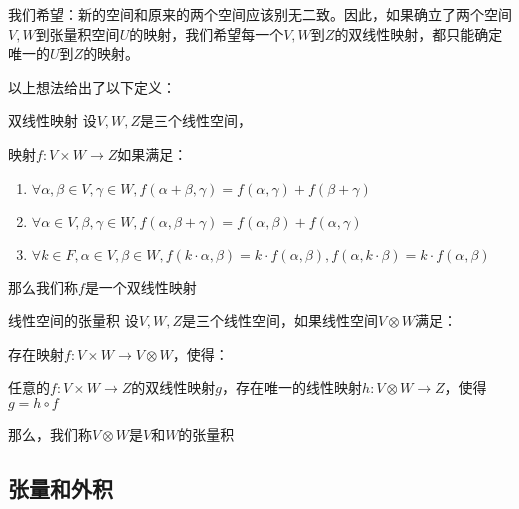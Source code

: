 \documentclass[12pt, a4paper, oneside, UTF8]{ctexbook}
\begin{document}
			我们希望：新的空间和原来的两个空间应该别无二致。因此，如果确立了两个空间$V,W$到张量积空间$U$的映射，我们希望每一个$V,W$到$Z$的双线性映射，都只能确定唯一的$U$到$Z$的映射。

			以上想法给出了以下定义：
			\begin{defn}{双线性映射}{}
				设$V,W,Z$是三个线性空间，

				映射$f:V \times W \to Z$如果满足：

				\begin{enumerate}
					\item $\forall \alpha ,\beta \in V,\gamma \in W,f(\alpha +\beta ,\gamma )=f(\alpha ,\gamma )+f(\beta +\gamma )$
					\item $\forall \alpha \in V,\beta ,\gamma \in W,f(\alpha ,\beta +\gamma )=f(\alpha ,\beta )+f(\alpha ,\gamma )$
					\item $\forall k \in F,\alpha \in V,\beta \in W,f(k\cdot\alpha ,\beta )=k\cdot f(\alpha ,\beta ),f(\alpha ,k\cdot \beta )=k\cdot f(\alpha ,\beta )$ 
				\end{enumerate}
				那么我们称$f$是一个双线性映射
			\end{defn}
			\begin{defn}{线性空间的张量积}{}
				设$V,W,Z$是三个线性空间，如果线性空间$V \otimes W$满足：

				存在映射$f:V \times W \to V \otimes W$，使得：

				任意的$f:V \times W \to Z$的双线性映射$g$，存在唯一的线性映射$h:V \otimes W \to Z$，使得$g = h \circ f$

				那么，我们称$V \otimes W$是$V$和$W$的张量积
			\end{defn}
		\subsection{张量和外积}
			
\end{document}
